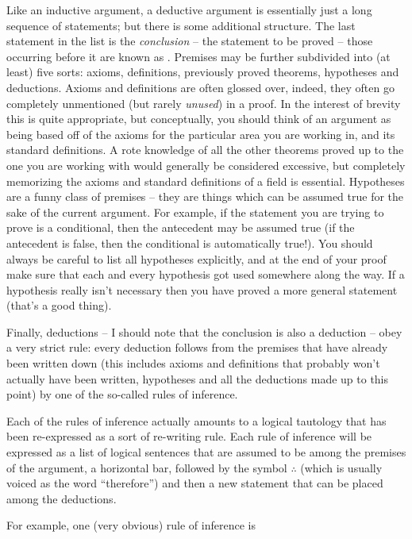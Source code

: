 Like an inductive argument, a deductive argument 
is essentially just a
long sequence of statements; but there is some additional structure.
The last statement in the list is the {\em conclusion} -- the statement
to be proved -- those occurring before it are known as 
.
Premises may be further subdivided into (at least) five sorts: axioms,
definitions, previously proved theorems, hypotheses and deductions.  
Axioms and definitions are often glossed
over, indeed, they often go completely unmentioned (but rarely {\em unused}) 
in a proof.  In the interest of brevity this is quite appropriate, but 
conceptually, you should think of an argument as being based off of 
the axioms for the particular area you are working in, and its standard 
definitions.  A rote knowledge of all the other theorems proved up to
the one you are working with would generally be considered excessive, 
but completely memorizing the axioms and standard definitions of a field 
is essential.  Hypotheses are a funny class of premises -- they are things
which can be assumed true for the sake of the current argument.  For
example, if the statement you are trying to prove is a conditional,
then the antecedent may be assumed true (if the antecedent is false,
then the conditional is automatically true!).  You should always be
careful to list all hypotheses explicitly, and at the end of your 
proof make sure that each and every hypothesis got used somewhere 
along the way.  If a hypothesis really isn't necessary then you have
proved a more general statement (that's a good thing). 

Finally, deductions -- I should note that the conclusion is also a 
deduction -- obey a very strict rule: every deduction follows from
the premises that have already been written down (this includes
axioms and definitions that probably won't actually have been written,
hypotheses and all the deductions made up to this point) by one of the 
so-called rules of inference.

Each of the rules of inference actually amounts to a logical tautology
that has been re-expressed as a sort of re-writing rule.   Each rule
of inference will be expressed as a list of logical 
sentences that are assumed to be among the premises of the argument, 
a horizontal bar, followed by the symbol $\therefore$ (which is
usually voiced as the word ``therefore'') and then a new statement 
that can be placed among the deductions.

For example, one (very obvious) rule of inference is

